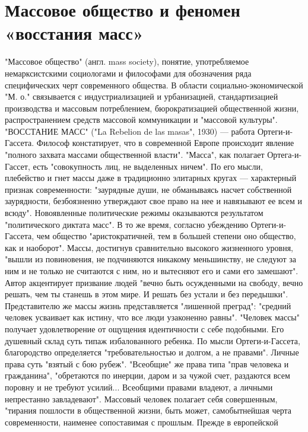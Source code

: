 \documentclass[12pt]{article}
\begin{document}
\section{Массовое общество и феномен «восстания масс»}
"Массовое  общество"  (англ.  mass  society),  понятие,  употребляемое  немарксистскими  социологами  и
философами  для  обозначения  ряда  специфических  черт  современного  общества.  В  области  социально-экономической "М. о."  связывается с индустриализацией и урбанизацией,  стандартизацией  производства  и 
массовым  потреблением,  бюрократизацией  общественной  жизни,  распространением  средств  массовой
коммуникации и "массовой культуры".
"ВОССТАНИЕ МАСС" ("La Rebelion de las masas", 1930) — работа Ортеги-и-Гассета. Философ констатирует,
что в современной Европе происходит явление "полного захвата массами общественной власти". "Масса", как
полагает Ортега-и-Гассет, есть "совокупность лиц, не выделенных ничем". По его мысли, плебейство и гнет
массы даже в традиционно элитарных кругах — характерный признак современности: "заурядные души, не
обманываясь насчет собственной заурядности, безбоязненно утверждают свое право на нее и навязывают ее
всем и всюду". Новоявленные политические режимы оказываются результатом "политического диктата масс". В
то же время, согласно убеждению Ортеги-и-Гассета, чем общество "аристократичней, тем в большей степени
оно  общество, как и  наоборот".  Массы, достигнув  сравнительно высокого  жизненного уровня, "вышли  из
повиновения, не подчиняются никакому меньшинству, не следуют за ним и не только не считаются с ним, но и
вытесняют его и  сами его замешают". Автор  акцентирует  призвание  людей "вечно быть  осужденными на
свободу, вечно решать, чем ты станешь в этом мире. И решать без устали и без передышки". Представителю же
массы  жизнь  представляется  "лишенной  преград":  "средний  человек  усваивает  как  истину,  что  все  люди
узаконенно равны". "Человек массы" получает удовлетворение от ощущения идентичности с себе подобными.
Его  душевный  склад  суть  типаж  избалованного  ребенка.  По  мысли  Ортеги-и-Гассета,  благородство
определяется  "требовательностью  и  долгом,  а  не  правами".  Личные  права  суть  "взятый  с  бою  рубеж".
"Всеобщие" же права типа "прав человека и гражданина", "обретаются по инерции, даром и за чужой счет,
раздаются  всем  поровну  и  не  требуют  усилий...  Всеобщими  правами  владеют,  а  личными  непрестанно
завладевают". Массовый человек полагает себя совершенным, "тирания пошлости в общественной жизни, быть
может,  самобытнейшая  черта  современности,  наименее  сопоставимая  с  прошлым.  Прежде  в  европейской
\end{document}

